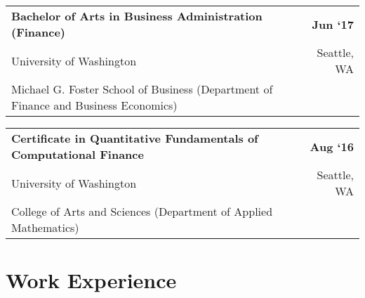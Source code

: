 \documentclass[10pt, letterpaper]{article}
\newcommand{\tabularxwidth}{\textwidth}
\begin{document}
    
        \begin{tabularx}{\tabularxwidth}{X r}
            \textbf{Bachelor of Arts in Business Administration (Finance)} & \textbf{
    Jun ‘17} \\
            \quad University of Washington & 
    Seattle, 
        WA \\
            \quad Michael G. Foster School of Business (Department of Finance and Business Economics) & \\
            
            
        \end{tabularx}

        
            \vspace{.5em}
        

    
        \begin{tabularx}{\tabularxwidth}{X r}
            \textbf{Certificate in Quantitative Fundamentals of Computational Finance} & \textbf{
    Aug ‘16} \\
            \quad University of Washington & 
    Seattle, 
        WA \\
            \quad College of Arts and Sciences (Department of Applied Mathematics) & \\
            
            
        \end{tabularx}

        

    


    
        \section{Work Experience}
\end{document}
